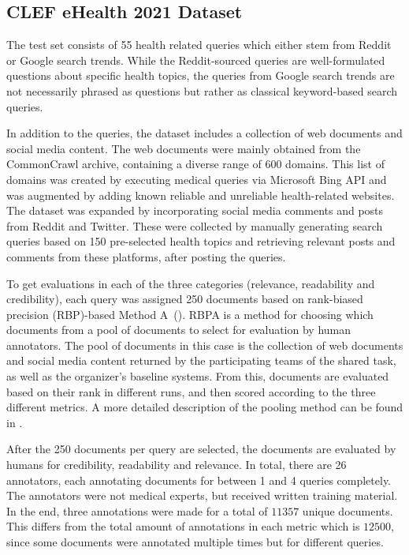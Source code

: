 \subsection{CLEF eHealth 2021 Dataset}
The test set consists of 55 health related queries which either stem from Reddit or Google search trends.
While the Reddit-sourced queries are well-formulated questions about specific health topics, the queries from Google search trends are not necessarily phrased as questions but rather as classical keyword-based search queries.

In addition to the queries, the dataset includes a collection of web documents and social media content.
The web documents were mainly obtained from the CommonCrawl archive, containing a diverse range of 600 domains.
This list of domains was created by executing medical queries via Microsoft Bing API and was augmented by adding known reliable and unreliable health-related websites.
The dataset was expanded by incorporating social media comments and posts from Reddit and Twitter.
These were collected by manually generating search queries based on 150 pre-selected health topics and retrieving relevant posts and comments from these platforms, after posting the queries.

To get evaluations in each of the three categories (relevance, readability and credibility), each query was assigned 250 documents based on rank-biased precision (RBP)-based Method A~(\cite{moffat:2008:Rank}).
RBPA is a method for choosing which documents from a pool of documents to select for evaluation by human annotators.
The pool of documents in this case is the collection of web documents and social media content returned by the participating teams of the shared task, as well as the organizer's baseline systems.
From this, documents are evaluated based on their rank in different runs, and then scored according to the three different metrics.
A more detailed description of the pooling method can be found in \cite{lipani:2017:Fixed}.

After the 250 documents per query are selected, the documents are evaluated by humans for credibility, readability and relevance.
In total, there are 26 annotators, each annotating documents for between 1 and 4 queries completely.
The annotators were not medical experts, but received written training material.
In the end, three annotations were made for  a total of $11 357$ unique documents.
This differs from the total amount of annotations in each metric which is $12 500$, since some documents were annotated multiple times but for different queries.

